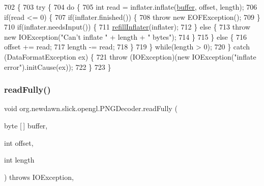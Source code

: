 \begin{DoxyCode}
702                                                                                                            
        \{
703         \textcolor{keywordflow}{try} \{
704             \textcolor{keywordflow}{do} \{
705                 \textcolor{keywordtype}{int} read = inflater.inflate(\mbox{\hyperlink{classorg_1_1newdawn_1_1slick_1_1opengl_1_1_p_n_g_decoder_ae205f9222586a2bc01a8a240c5c210ad}{buffer}}, offset, length);
706                 \textcolor{keywordflow}{if}(read <= 0) \{
707                     \textcolor{keywordflow}{if}(inflater.finished()) \{
708                         \textcolor{keywordflow}{throw} \textcolor{keyword}{new} EOFException();
709                     \}
710                     \textcolor{keywordflow}{if}(inflater.needsInput()) \{
711                         \mbox{\hyperlink{classorg_1_1newdawn_1_1slick_1_1opengl_1_1_p_n_g_decoder_a041df9ceb129f2b773de08dff8899a28}{refillInflater}}(inflater);
712                     \} \textcolor{keywordflow}{else} \{
713                         \textcolor{keywordflow}{throw} \textcolor{keyword}{new} IOException(\textcolor{stringliteral}{"Can't inflate "} + length + \textcolor{stringliteral}{" bytes"});
714                     \}
715                 \} \textcolor{keywordflow}{else} \{
716                     offset += read;
717                     length -= read;
718                 \}
719             \} \textcolor{keywordflow}{while}(length > 0);
720         \} \textcolor{keywordflow}{catch} (DataFormatException ex) \{
721             \textcolor{keywordflow}{throw} (IOException)(\textcolor{keyword}{new} IOException(\textcolor{stringliteral}{"inflate error"}).initCause(ex));
722         \}
723     \}
\end{DoxyCode}
\mbox{\label{classorg_1_1newdawn_1_1slick_1_1opengl_1_1_p_n_g_decoder_ac1389015c67277f87b9f759e6095f2c0}} 
\subsubsection{\texorpdfstring{read\+Fully()}{readFully()}}
{\footnotesize\ttfamily void org.\+newdawn.\+slick.\+opengl.\+P\+N\+G\+Decoder.\+read\+Fully (\begin{DoxyParamCaption}\item[{byte \mbox{[}$\,$\mbox{]}}]{buffer,  }\item[{int}]{offset,  }\item[{int}]{length }\end{DoxyParamCaption}) throws I\+O\+Exception\hspace{0.3cm}{\ttfamily [inline]}, {\ttfamily [private]}}


